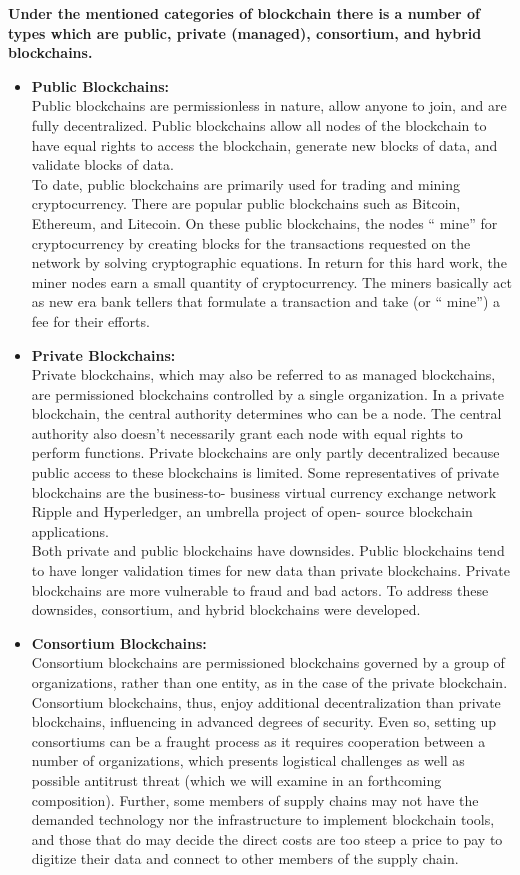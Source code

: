 				\textbf{Under the mentioned categories of blockchain there is a number of types which are public, private (managed), consortium, and hybrid blockchains.}
				\begin{itemize}
					\let\labelitemi\labelitemii
					\item \textbf{Public Blockchains:} \\
					Public blockchains are permissionless in nature, allow anyone to join, and are fully decentralized. Public blockchains allow all nodes of the blockchain to have equal rights to access the blockchain, generate new blocks of data, and validate blocks of data. \\
					To date, public blockchains are primarily used for trading and mining cryptocurrency. There are popular public blockchains such as Bitcoin, Ethereum, and Litecoin. On these public blockchains, the nodes “ mine” for cryptocurrency by creating blocks for the transactions requested on the network by solving cryptographic equations. In return for this hard work, the miner nodes earn a small quantity of cryptocurrency. The miners basically act as new era bank tellers that formulate a transaction and take (or “ mine”) a fee for their efforts. 
					\item \textbf{Private Blockchains:} \\
					Private blockchains, which may also be referred to as managed blockchains, are permissioned blockchains controlled by a single organization. In a private blockchain, the central authority determines who can be a node. The central authority also doesn't necessarily grant each node with equal rights to perform functions. Private blockchains are only partly decentralized because public access to these blockchains is limited. Some representatives of private blockchains are the business-to- business virtual currency exchange network Ripple and Hyperledger, an umbrella project of open- source blockchain applications. \\
					Both private and public blockchains have downsides. Public blockchains tend to have longer validation times for new data than private blockchains. Private blockchains are more vulnerable to fraud and bad actors. To address these downsides, consortium, and hybrid blockchains were developed. 
					\item \textbf{Consortium Blockchains:} \\
					Consortium blockchains are permissioned blockchains governed by a group of organizations, rather than one entity, as in the case of the private blockchain. Consortium blockchains, thus, enjoy additional decentralization than private blockchains, influencing in advanced degrees of security. Even so, setting up consortiums can be a fraught process as it requires cooperation between a number of organizations, which presents logistical challenges as well as possible antitrust threat (which we will examine in an forthcoming composition). Further, some members of supply chains may not have the demanded technology nor the infrastructure to implement blockchain tools, and those that do may decide the direct costs are too steep a price to pay to digitize their data and connect to other members of the supply chain. 

\end{itemize}
